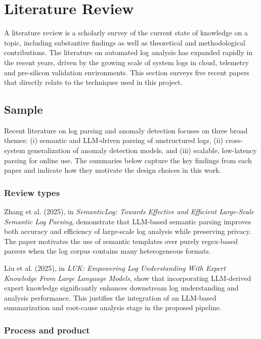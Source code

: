 \section[Literature Review]{\textbf{Literature Review}}

A literature review is a scholarly survey of the current state of knowledge on a topic, including substantive findings as well as theoretical and methodological contributions. The literature on automated log analysis has expanded rapidly in the recent years, driven by the growing scale of system logs in cloud, telemetry and pre-silicon validation environments. This section surveys five recent papers that directly relate to the techniques used in this project.

\subsection{Sample}
Recent literature on log parsing and anomaly detection focuses on three broad themes: (i) semantic and LLM-driven parsing of unstructured logs, (ii) cross-system generalization of anomaly detection models, and (iii) scalable, low-latency parsing for online use. The summaries below capture the key findings from each paper and indicate how they motivate the design choices in this work.

\subsubsection[Review types]{\textbf{Review types}}

Zhang et al. (2025), in \textit{SemanticLog: Towards Effective and Efficient Large-Scale Semantic Log Parsing}, demonstrate that LLM-based semantic parsing improves both accuracy and efficiency of large-scale log analysis while preserving privacy. The paper motivates the use of semantic templates over purely regex-based parsers when the log corpus contains many heterogeneous formats.

Liu et al. (2025), in \textit{LUK: Empowering Log Understanding With Expert Knowledge From Large Language Models}, show that incorporating LLM-derived expert knowledge significantly enhances downstream log understanding and analysis performance. This justifies the integration of an LLM-based summarization and root-cause analysis stage in the proposed pipeline.

\subsubsection[Process and product]{\textbf{Process and product}}

